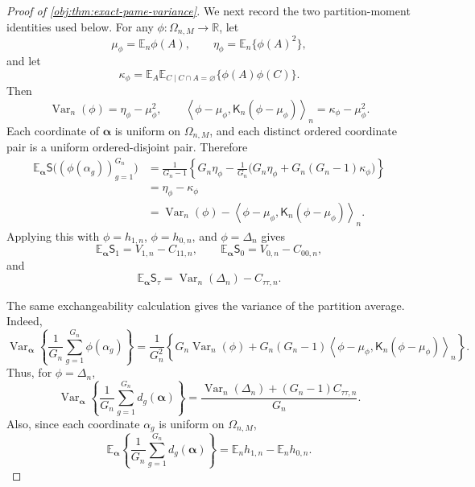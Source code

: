 \documentclass[11pt]{article}
\begin{document}
\begin{proof}[Proof of \cref{obj:thm:exact-pame-variance}]
We next record the two partition-moment identities used below. For any
\(\phi:\Omega_{n,M}\to\mathbb R\), let
\[
\mu_\phi=\mathbb E_n\phi(A),\qquad
\eta_\phi=\mathbb E_n\{\phi(A)^2\},
\]
and let
\[
\kappa_\phi
=
\mathbb E_A\mathbb E_{C\mid C\cap A=\varnothing}\{\phi(A)\phi(C)\}.
\]
Then
\[
\operatorname{Var}_n(\phi)=\eta_\phi-\mu_\phi^2,
\qquad
\left\langle \phi-\mu_\phi,\mathsf K_n(\phi-\mu_\phi)\right\rangle_n
=\kappa_\phi-\mu_\phi^2 .
\]
Each coordinate of \(\boldsymbol\alpha\) is uniform on \(\Omega_{n,M}\), and each distinct ordered coordinate pair is a uniform ordered-disjoint pair. Therefore
\[
\begin{aligned}
\mathbb E_{\boldsymbol\alpha}\mathsf S\bigl((\phi(\alpha_g))_{g=1}^{G_n}\bigr)
&=
\frac{1}{G_n-1}
\left\{
G_n\eta_\phi
-\frac1{G_n}\bigl(G_n\eta_\phi+G_n(G_n-1)\kappa_\phi\bigr)
\right\} \\
&=\eta_\phi-\kappa_\phi \\
&=
\operatorname{Var}_n(\phi)
-
\left\langle \phi-\mu_\phi,\mathsf K_n(\phi-\mu_\phi)\right\rangle_n .
\end{aligned}
\]
Applying this with \(\phi=h_{1,n}\), \(\phi=h_{0,n}\), and \(\phi=\Delta_n\) gives
\[
\mathbb E_{\boldsymbol\alpha}\mathsf S_1=V_{1,n}-C_{11,n},\qquad
\mathbb E_{\boldsymbol\alpha}\mathsf S_0=V_{0,n}-C_{00,n},
\]
and
\[
\mathbb E_{\boldsymbol\alpha}\mathsf S_\tau
=
\operatorname{Var}_n(\Delta_n)-C_{\tau\tau,n}.
\]

The same exchangeability calculation gives the variance of the partition average. Indeed,
\[
\operatorname{Var}_{\boldsymbol\alpha}
\left\{
\frac1{G_n}\sum_{g=1}^{G_n}\phi(\alpha_g)
\right\}
=
\frac{1}{G_n^2}
\left\{
G_n\operatorname{Var}_n(\phi)
+
G_n(G_n-1)
\left\langle \phi-\mu_\phi,\mathsf K_n(\phi-\mu_\phi)\right\rangle_n
\right\}.
\]
Thus, for \(\phi=\Delta_n\),
\[
\operatorname{Var}_{\boldsymbol\alpha}
\left\{
\frac1{G_n}\sum_{g=1}^{G_n}d_g(\boldsymbol\alpha)
\right\}
=
\frac{\operatorname{Var}_n(\Delta_n)+(G_n-1)C_{\tau\tau,n}}{G_n}.
\]
Also, since each coordinate \(\alpha_g\) is uniform on \(\Omega_{n,M}\),
\[
\mathbb E_{\boldsymbol\alpha}
\left\{
\frac1{G_n}\sum_{g=1}^{G_n}d_g(\boldsymbol\alpha)
\right\}
=
\mathbb E_n h_{1,n}-\mathbb E_n h_{0,n}.
\]


\end{proof}
\end{document}
